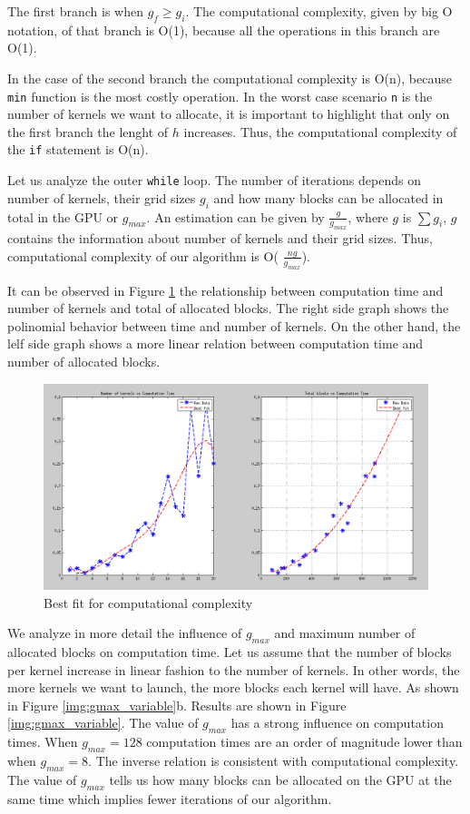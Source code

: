 \documentclass[
  12pt,
  a4paperpaper,
]{report}
\begin{document}
The first branch is when \(g_f \geq g_i\). The computational complexity,
given by big O notation, of that branch is O(1), because all the
operations in this branch are O(1).

In the case of the second branch the computational complexity is O(n),
because \texttt{min} function is the most costly operation. In the worst
case scenario \texttt{n} is the number of kernels we want to allocate,
it is important to highlight that only on the first branch the lenght of
\(h\) increases. Thus, the computational complexity of the \texttt{if}
statement is O(n).

Let us analyze the outer \texttt{while} loop. The number of iterations
depends on number of kernels, their grid sizes \(g_i\) and how many
blocks can be allocated in total in the GPU or \(g_{max}\). An
estimation can be given by \(\frac{g}{g_{max}}\), where \(g\) is
\(\sum g_i\), \(g\) contains the information about number of kernels and
their grid sizes. Thus, computational complexity of our algorithm is O(
\(\frac{ng}{g_{max}}\)).

It can be observed in Figure \ref{img:bestfit} the relationship between
computation time and number of kernels and total of allocated blocks.
The right side graph shows the polinomial behavior between time and
number of kernels. On the other hand, the lelf side graph shows a more
linear relation between computation time and number of allocated blocks.

\begin{figure}
\centering
\includegraphics[width=1\textwidth,height=\textheight]{source/figures/max100min2gmax10.png}
\caption{Best fit for computational complexity \label{img:bestfit}}
\end{figure}

We analyze in more detail the influence of \(g_{max}\) and maximum
number of allocated blocks on computation time. Let us assume that
the number of blocks per kernel increase in linear fashion to the number of
kernels. In other words, the more kernels we want to launch, the more
blocks each kernel will have. As shown in Figure
\ref{img:gmax_variable}b. Results are shown in Figure
\ref{img:gmax_variable}. The value of \(g_{max}\) has a strong influence
on computation times. When \(g_{max} = 128\) computation times are an
order of magnitude lower than when \(g_{max} = 8\). The inverse relation
is consistent with computational complexity. The value of \(g_{max}\)
tells us how many blocks can be allocated on the GPU at the same time
which implies fewer iterations of our algorithm.
\end{document}
